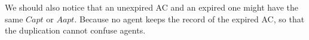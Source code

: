 We should also notice that an unexpired AC and an expired one might have the same $Capt$ or $Aapt$. Because no agent keeps the record of the expired AC, so that the duplication cannot confuse agents.




































